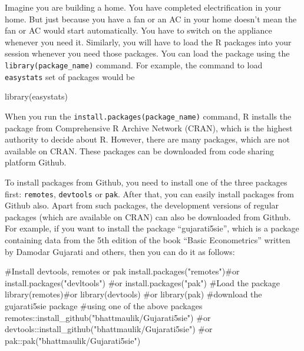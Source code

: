 \documentclass[
  letterpaper,
  paper =a4,
  twoside,
  openright,
  headsepline,
  footsepline,
  listof = totocnumbered,
  chapterprefix = true,
  firstiscover,
  parskip = full*]{scrbook}
\newenvironment{Shaded}{\begin{snugshade}}{\end{snugshade}}
\newcommand{\CommentTok}[1]{\textcolor[rgb]{0.37,0.37,0.37}{#1}}
\newcommand{\FunctionTok}[1]{\textcolor[rgb]{0.28,0.35,0.67}{#1}}
\newcommand{\NormalTok}[1]{\textcolor[rgb]{0.00,0.23,0.31}{#1}}
\newcommand{\SpecialCharTok}[1]{\textcolor[rgb]{0.37,0.37,0.37}{#1}}
\newcommand{\StringTok}[1]{\textcolor[rgb]{0.13,0.47,0.30}{#1}}
\begin{document}
Imagine you are building a home. You have completed electrification in
your home. But just because you have a fan or an AC in your home doesn't
mean the fan or AC would start automatically. You have to switch on the
appliance whenever you need it. Similarly, you will have to load the R
packages into your session whenever you need those packages. You can
load the package using the \texttt{library(package\_name)} command. For
example, the command to load \texttt{easystats} set of packages would be

\begin{Shaded}
\begin{Highlighting}[]
\FunctionTok{library}\NormalTok{(easystats)}
\end{Highlighting}
\end{Shaded}

When you run the \texttt{install.packages(package\_name)} command, R
installs the package from Comprehensive R Archive Network (CRAN), which
is the highest authority to decide about R. However, there are many
packages, which are not available on CRAN. These packages can be
downloaded from code sharing platform Github.

To install packages from Github, you need to install one of the three
packages first: \texttt{remotes}, \texttt{devtools} or \texttt{pak}.
After that, you can easily install packages from Github also. Apart from
such packages, the development versions of regular packages (which are
available on CRAN) can also be downloaded from Github. For example, if
you want to install the package ``gujarati5sie'', which is a package
containing data from the 5th edition of the book ``Basic Econometrics''
written by Damodar Gujarati and others, then you can do it as follows:

\begin{Shaded}
\begin{Highlighting}[]
\CommentTok{\#Install devtools, remotes or pak}
\FunctionTok{install.packages}\NormalTok{(}\StringTok{"remotes"}\NormalTok{)}\CommentTok{\#or install.packages("devltools")}
\CommentTok{\#or install.packages("pak")}
\CommentTok{\#Load the package}
\FunctionTok{library}\NormalTok{(remotes)}\CommentTok{\#or library(devtools) }
\CommentTok{\#or library(pak)}
\CommentTok{\#download the gujarati5sie package }
\CommentTok{\#using one of the above packages}
\NormalTok{remotes}\SpecialCharTok{::}\FunctionTok{install\_github}\NormalTok{(}\StringTok{"bhattmaulik/Gujarati5sie"}\NormalTok{)}
\CommentTok{\#or devtools::install\_github("bhattmaulik/Gujarati5sie") }
\CommentTok{\#or pak::pak("bhattmaulik/Gujarati5sie")}
\end{Highlighting}
\end{Shaded}
\end{document}
